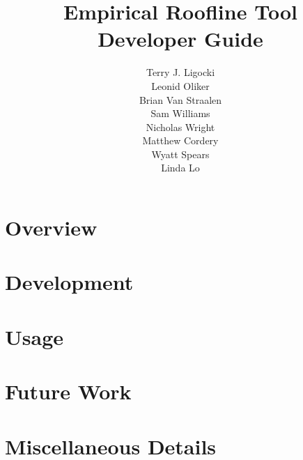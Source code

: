 \documentclass[12pt]{report}
\title{Empirical Roofline Tool \\
       Developer Guide
      }
\author{Terry J. Ligocki \\
        Leonid Oliker \\
        Brian Van Straalen \\
        Sam Williams \\
        Nicholas Wright \\
        Matthew Cordery \\
        Wyatt Spears \\
        Linda Lo
       }
\begin{document}
\maketitle

\tableofcontents

\chapter{Overview}
\label{chapter:overview}


\chapter{Development}
\label{chapter:development}


\chapter{Usage}
\label{chapter:usage}


\chapter{Future Work}
\label{chapter:future}


\appendix
\chapter{Miscellaneous Details}
\label{appendix:details}

\end{document}

